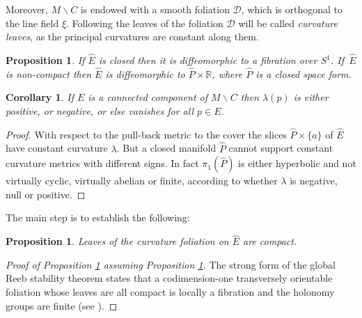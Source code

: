 \documentclass[JEP,XML,SOM,Unicode]{cedram}
\let\mathcal\mathscr
\let\moins\smallsetminus
\newtheorem{proposition}[theorem]{Proposition}
\newtheorem{corollary}[theorem]{Corollary}
\theoremstyle{definition}
\theoremstyle{remark}
\numberwithin{equation}{section}
\begin{document}
Moreover, $M\moins C$ is endowed with a smooth foliation $\mathcal D$, which is orthogonal to the line field $\xi$.
Following \cite{Re} the leaves of the foliation $\mathcal D$ will be called \emph{curvature leaves},
as the principal curvatures are constant along them.

\begin{proposition}\label{dicho}
If $\widehat{E}$ is closed then it is diffeomorphic to a
fibration over $S^1$. If~$\widehat{E}$ is non-compact then
$\widehat{E}$ is diffeomorphic to $\widehat{P}\times \mathbb R$, where
$\widehat{P}$ is a closed space form.
\end{proposition}

\begin{corollary}\label{sign}
If $E$ is a connected component of $M\moins C$ then
$\lambda(p)$ is either positive, or negative, or else
vanishes for all $p\in E$.
\end{corollary}
\begin{proof}
With respect to the pull-back metric to the cover the slices
$\widehat{P}\times \{a\}$ of $\widehat{E}$ have constant curvature $\lambda$.
But a closed manifold $\widehat{P}$ cannot support constant
curvature metrics with different signs. In fact $\pi_1(\widehat{P})$ is either
hyperbolic and not virtually cyclic, virtually abelian or finite, according to whether $\lambda$ is negative, null or positive.
\end{proof}

The main step is to establish the following:

\begin{proposition}\label{compactleaf}
Leaves of the curvature foliation on $\widehat{E}$ are compact.
\end{proposition}

\begin{proof}[Proof of Proposition \ref{dicho}
assuming Proposition \ref{compactleaf}]
The strong form of the global Reeb stability theorem states that
a codimension-one transversely orientable
foliation whose leaves are all compact
is locally a fibration and the holonomy groups are finite (see
\cite{Mil,EMS}).
\end{proof}
\end{document}
